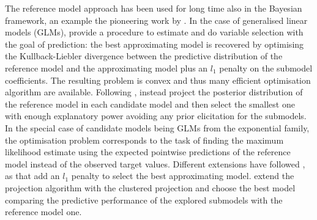 \documentclass[american,]{article}
\theoremstyle{definition}
\begin{document}
The reference model approach has been used for long time also in the Bayesian framework, an example the pioneering work by \cite{paper:reference_lindley}. In the case of generalised linear models (GLMs), \cite{paper:tran_predictivelasso} provide a procedure to estimate and do variable selection with the goal of prediction: the best approximating model is recovered by optimising the Kullback-Liebler divergence between the predictive distribution of the reference model and the approximating model plus an $l_{1}$ penalty on the submodel coefficients. The resulting problem is convex and thus many efficient optimisation algorithm are available. Following \cite{paper:goutis_projection}, \cite{paper:original_proj}  instead project the posterior distribution of the reference model in each candidate model and then select the smallest one with enough explanatory power avoiding any prior elicitation for the submodels. In the special case of candidate models being GLMs from the exponential family, the optimisation problem corresponds to the task of finding the maximum likelihood estimate using the expected pointwise predictions of the reference model instead of the observed target values. Different extensions have followed \cite{paper:original_proj}, as \cite{paper:nott_projection} that add an $l_{1}$ penalty to select the best approximating model. \cite{paper:projpred} extend the projection algorithm with the clustered projection and choose the best model comparing the predictive performance of the explored submodels with the reference model one.

\end{document}
